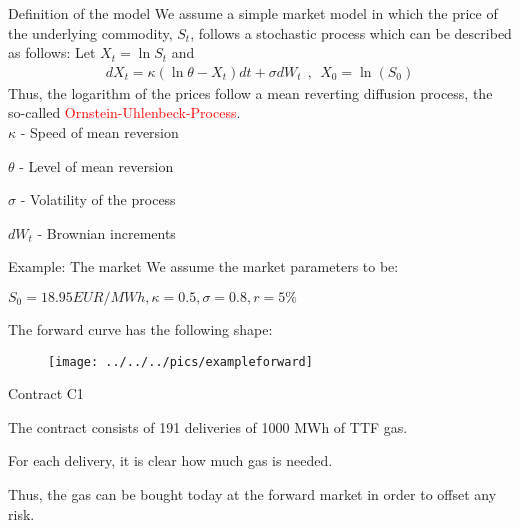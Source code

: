 {Definition of the model}
We assume a simple market model in which the price of the underlying commodity, $S_t$, follows a stochastic process which can be described as follows:
Let $X_t = \ln S_t$ and
\begin{align*}
	dX_t = \kappa (\ln \theta - X_t)dt + \sigma dW_t~~,~~X_0 = \ln(S_0)
\end{align*}
Thus, the logarithm of the prices follow a mean reverting diffusion process, the so-called \textcolor{red}{Ornstein-Uhlenbeck-Process}.\\






	$\kappa$ - Speed of mean reversion

	$\theta$ - Level of mean reversion

	$\sigma$ - Volatility of the process

	$dW_t$ - Brownian increments






{Example: The market}
We assume the market parameters to be:






	$S_0 = 18.95 EUR/MWh, \kappa = 0.5, \sigma = 0.8, r= 5\%$






The forward curve has the following shape:
\begin{figure}
	\centering
		\texttt{[image: ../../../pics/exampleforward]}
	\label{fig:exampleforward}
\end{figure}

{Contract C1}






	The contract consists of 191 deliveries of 1000 MWh of TTF gas.

	For each delivery, it is clear how much gas is needed.

	Thus, the gas can be bought today at the forward market in order to offset any risk.






